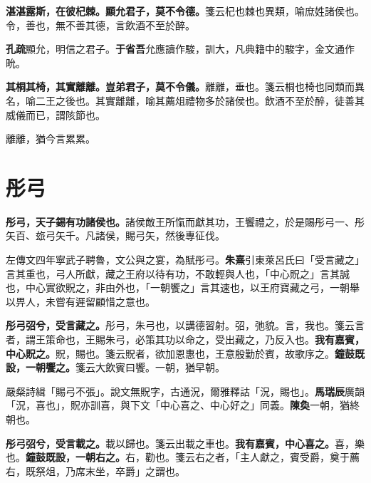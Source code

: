\textbf{湛湛露斯，在彼杞棘。顯允君子，莫不令德。}{\footnotesize 箋云杞也棘也異類，喻庶姓諸侯也。令，善也，無不善其德，言飲酒不至於醉。}

\begin{quoting}\textbf{孔疏}顯允，明信之君子。\textbf{于省吾}允應讀作駿，訓大，凡典籍中的駿字，金文通作㽙。\end{quoting}

\textbf{其桐其椅，其實離離。豈弟君子，莫不令儀。}{\footnotesize 離離，垂也。箋云桐也椅也同類而異名，喻二王之後也。其實離離，喻其薦俎禮物多於諸侯也。飲酒不至於醉，徒善其威儀而已，謂陔節也。}

\begin{quoting}離離，猶今言累累。\end{quoting}

\section{彤弓}


\textbf{彤弓，天子錫有功諸侯也。}{\footnotesize 諸侯敵王所愾而獻其功，王饗禮之，於是賜彤弓一、彤矢百、玈弓矢千。凡諸侯，賜弓矢，然後專征伐。}

\begin{quoting}左傳文四年寧武子聘魯，文公與之宴，為賦彤弓。\textbf{朱熹}引東萊呂氏曰「受言藏之」言其重也，弓人所獻，藏之王府以待有功，不敢輕與人也，「中心貺之」言其誠也，中心實欲貺之，非由外也，「一朝饗之」言其速也，以王府寶藏之弓，一朝舉以畀人，未嘗有遲留顧惜之意也。\end{quoting}

\textbf{彤弓弨兮，受言藏之。}{\footnotesize 彤弓，朱弓也，以講德習射。弨，弛貌。言，我也。箋云言者，謂王策命也，王賜朱弓，必策其功以命之，受出藏之，乃反入也。}\textbf{我有嘉賓，中心貺之。}{\footnotesize 貺，賜也。箋云貺者，欲加恩惠也，王意殷勤於賓，故歌序之。}\textbf{鐘鼓既設，一朝饗之。}{\footnotesize 箋云大飲賓曰饗。一朝，猶早朝。}

\begin{quoting}嚴粲詩緝「賜弓不張」。說文無貺字，古通況，爾雅釋詁「況，賜也」。\textbf{馬瑞辰}廣韻「況，喜也」，貺亦訓喜，與下文「中心喜之、中心好之」同義。\textbf{陳奐}一朝，猶終朝也。\end{quoting}

\textbf{彤弓弨兮，受言載之。}{\footnotesize 載以歸也。箋云出載之車也。}\textbf{我有嘉賓，中心喜之。}{\footnotesize 喜，樂也。}\textbf{鐘鼓既設，一朝右之。}{\footnotesize 右，勸也。箋云右之者，「主人獻之，賓受爵，奠于薦右，既祭俎，乃席末坐，卒爵」之謂也。}

